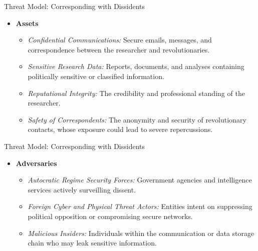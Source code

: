 \documentclass[aspectratio=169]{beamer}
\begin{document}
\begin{frame}{Threat Model: Corresponding with Dissidents}
  \begin{itemize}
    \item[] \textbf{Assets}
      \begin{itemize}
        \item \textit{Confidential Communications:} Secure emails, messages, and correspondence between the researcher and revolutionaries.
        \item \textit{Sensitive Research Data:} Reports, documents, and analyses containing politically sensitive or classified information.
        \item \textit{Reputational Integrity:} The credibility and professional standing of the researcher.
        \item \textit{Safety of Correspondents:} The anonymity and security of revolutionary contacts, whose exposure could lead to severe repercussions.
      \end{itemize}
  \end{itemize}
\end{frame}

\begin{frame}{Threat Model: Corresponding with Dissidents}
  \begin{itemize}
    \item[] \textbf{Adversaries}
      \begin{itemize}
        \item \textit{Autocratic Regime Security Forces:} Government agencies and intelligence services actively surveilling dissent.
        \item \textit{Foreign Cyber and Physical Threat Actors:} Entities intent on suppressing political opposition or compromising secure networks.
        \item \textit{Malicious Insiders:} Individuals within the communication or data storage chain who may leak sensitive information.
      \end{itemize}
  \end{itemize}
\end{frame}
\end{document}
